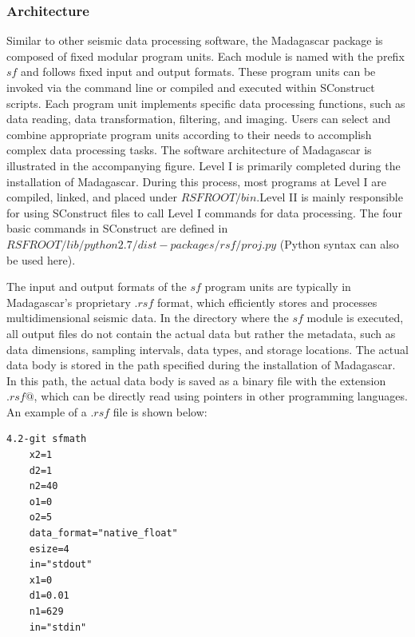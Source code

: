 \subsubsection{Architecture}
Similar to other seismic data processing software, the Madagascar package is composed of fixed modular program units. Each module is named with the prefix $sf$ and follows fixed input and output formats. These program units can be invoked via the command line or compiled and executed within SConstruct scripts. Each program unit implements specific data processing functions, such as data reading, data transformation, filtering, and imaging. Users can select and combine appropriate program units according to their needs to accomplish complex data processing tasks. The software architecture of Madagascar is illustrated in the accompanying figure.
{Level I is primarily completed during the installation of Madagascar. During this process, most programs at Level I are compiled, linked, and placed under $RSFROOT/bin$.Level II is mainly responsible for using SConstruct files to call Level I commands for data processing. The four basic commands in SConstruct are defined in $RSFROOT/lib/python2.7/dist-packages/rsf/proj.py$ (Python syntax can also be used here).}

The input and output formats of the $sf$ program units are typically in Madagascar's proprietary $.rsf$ format, which efficiently stores and processes multidimensional seismic data. In the directory where the $sf$ module is executed, all output files do not contain the actual data but rather the metadata, such as data dimensions, sampling intervals, data types, and storage locations. The actual data body is stored in the path specified during the installation of Madagascar. In this path, the actual data body is saved as a binary file with the extension $.rsf@$, which can be directly read using pointers in other programming languages. An example of a $.rsf$ file is shown below:
\begin{verbatim}
4.2-git	sfmath	
    x2=1
    d2=1
    n2=40
    o1=0
    o2=5
    data_format="native_float"
    esize=4
    in="stdout"
    x1=0
    d1=0.01
    n1=629
    in="stdin"
\end{verbatim}


